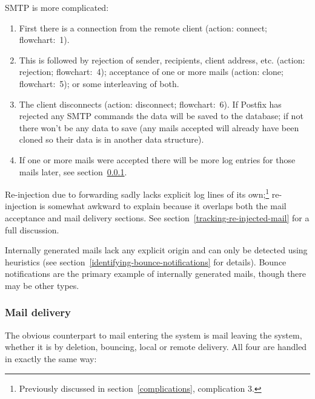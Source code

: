 \documentclass[a4paper,12pt,draft]{article}
\begin{document}
SMTP is more complicated: 

\begin{enumerate}
        
    \item First there is a connection from the remote client
        (action: connect; flowchart:~1).

    \item This is followed by rejection of sender, recipients, client
        address, etc. (action: rejection; flowchart:~4); acceptance of one
        or more mails (action: clone; flowchart:~5); or some interleaving
        of both.
        
    \item The client disconnects (action: disconnect; flowchart:~6).  If
        Postfix has rejected any SMTP commands the data will be saved to
        the database; if not there won't be any data to save (any mails
        accepted will already have been cloned so their data is in another
        data structure).

    \item If one or more mails were accepted there will be more log entries
        for those mails later, see section~\ref{mail-delivery}.

\end{enumerate}

Re-injection due to forwarding sadly lacks explicit log lines of its
own;\footnote{Previously discussed in section~\ref{complications},
complication 3.} re-injection is somewhat awkward to explain because it
overlaps both the mail acceptance and mail delivery sections.  See
section~\ref{tracking-re-injected-mail} for a full discussion.

Internally generated mails lack any explicit origin and can only be
detected using heuristics (see
section~\ref{identifying-bounce-notifications} for details).  Bounce
notifications are the primary example of internally generated mails, though
there may be other types.

\subsubsection{Mail delivery}

\label{mail-delivery}

The obvious counterpart to mail entering the system is mail leaving the
system, whether it is by deletion, bouncing, local or remote delivery.  All
four are handled in exactly the same way:
\end{document}
